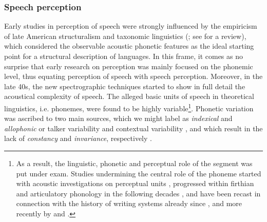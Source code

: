 \subsubsection{Speech perception}\label{sec1111}
Early studies in perception of speech were strongly influenced by the empiricism of late American structuralism and taxonomic linguistics (\citealt{harris1955phoneme, chomsky1965aspects}; see \citealt{matthews1993grammatical} for a review), which considered the observable acoustic phonetic features as the ideal starting point for a structural description of languages. In this frame, it comes as no surprise that early research on perception was mainly focused on the phonemic level, thus equating perception of speech with speech perception. Moreover, in the late 40s, the new spectrographic techniques started to show in full detail the acoustical complexity of speech. The alleged basic units of speech in theoretical linguistics, i.e. phonemes, were found to be highly variable\footnote{As a result, the linguistic, phonetic and perceptual role of the segment was put under exam. Studies undermining the central role of the phoneme started with acoustic investigations on perceptual units \citep{cooper1952experiments}, progressed within firthian and articulatory phonology in the following decades \citep{firth1948prosodies,browman1986articulatory}, and have been recast in connection with the history of writing systems already since \citet{faber1992phonemic}, and more recently by \citet{albanoleoni2006statuto} and \citet{port2006graphical}.}. Phonetic variation was ascribed to two main sources, which we might label as \textit{indexical} and \textit{allophonic} \citep{luce2003abstractness} or talker variability and contextual variability \citep{johnson1997complex}, and which result in the lack of \textit{constancy} and \textit{invariance}, respectively \citep{jusczyk2002speech}. 

